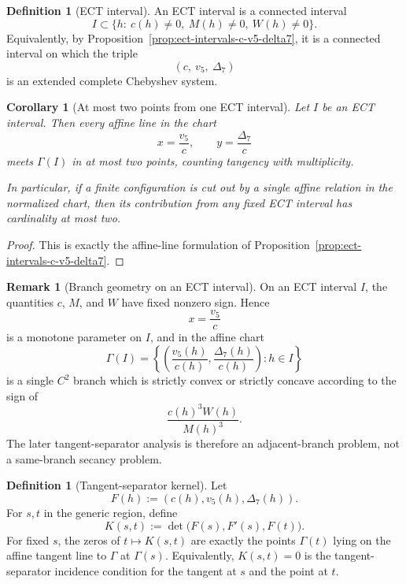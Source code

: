 \documentclass[11pt,a4paper]{amsart}
\theoremstyle{plain}
\newtheorem{corollary}[theorem]{Corollary}
\theoremstyle{definition}
\newtheorem{definition}[theorem]{Definition}
\newtheorem{remark}[theorem]{Remark}
\begin{document}
\begin{definition}[ECT interval]
\label{def:ect-interval}
An ECT interval is a connected interval
\[
I\subset\{h:\ c(h)\neq 0,\ M(h)\neq 0,\ W(h)\neq 0\}.
\]
Equivalently, by Proposition~\ref{prop:ect-intervals-c-v5-delta7}, it is a
connected interval on which the triple
\[
(c,\ v_5,\ \Delta_7)
\]
is an extended complete Chebyshev system.
\end{definition}

\begin{corollary}[At most two points from one ECT interval]
\label{cor:two-points-per-ect-interval}
Let $I$ be an ECT interval. Then every affine line in the chart
\[
x=\frac{v_5}{c},
\qquad
y=\frac{\Delta_7}{c}
\]
meets $\Gamma(I)$ in at most two points, counting tangency with multiplicity.

In particular, if a finite configuration is cut out by a single affine
relation in the normalized chart, then its contribution from any fixed ECT
interval has cardinality at most two.
\end{corollary}

\begin{proof}
This is exactly the affine-line formulation of
Proposition~\ref{prop:ect-intervals-c-v5-delta7}.
\end{proof}

\begin{remark}[Branch geometry on an ECT interval]
\label{rem:branch-geometry-ect-interval}
On an ECT interval $I$, the quantities $c$, $M$, and $W$ have fixed nonzero
sign. Hence
\[
x=\frac{v_5}{c}
\]
is a monotone parameter on $I$, and in the affine chart
\[
\Gamma(I)=\left\{\left(\frac{v_5(h)}{c(h)},\frac{\Delta_7(h)}{c(h)}\right):h\in I\right\}
\]
is a single $C^2$ branch which is strictly convex or strictly concave
according to the sign of
\[
\frac{c(h)^3W(h)}{M(h)^3}.
\]
The later tangent-separator analysis is therefore an adjacent-branch problem,
not a same-branch secancy problem.
\end{remark}

\begin{definition}[Tangent-separator kernel]
\label{def:tangent-separator-kernel}
Let
\[
F(h):=(c(h),v_5(h),\Delta_7(h)).
\]
For $s,t$ in the generic region, define
\[
K(s,t):=\det\!\bigl(F(s),F'(s),F(t)\bigr).
\]
For fixed $s$, the zeros of $t\mapsto K(s,t)$ are exactly the points
$\Gamma(t)$ lying on the affine tangent line to $\Gamma$ at $\Gamma(s)$.
Equivalently, $K(s,t)=0$ is the tangent-separator incidence condition for
the tangent at $s$ and the point at $t$.
\end{definition}
\end{document}
